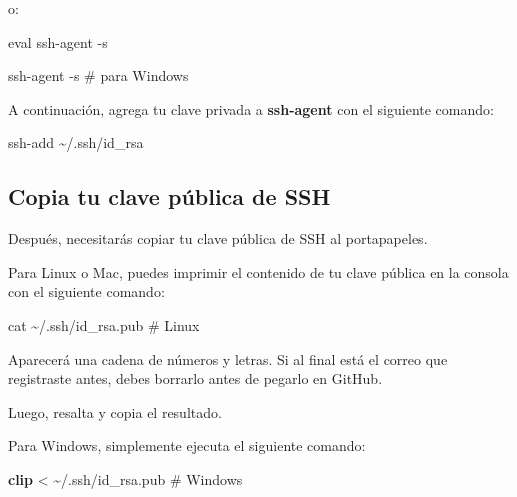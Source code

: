 \documentclass[
  a4paper,
]{article}
\newenvironment{Shaded}{}{}
\newcommand{\AttributeTok}[1]{\textcolor[rgb]{0.84,0.23,0.29}{#1}}
\newcommand{\BuiltInTok}[1]{\textcolor[rgb]{0.84,0.23,0.29}{#1}}
\newcommand{\CommentTok}[1]{\textcolor[rgb]{0.42,0.45,0.49}{#1}}
\newcommand{\ExtensionTok}[1]{\textcolor[rgb]{0.84,0.23,0.29}{\textbf{#1}}}
\newcommand{\FunctionTok}[1]{\textcolor[rgb]{0.44,0.26,0.76}{#1}}
\newcommand{\NormalTok}[1]{\textcolor[rgb]{0.14,0.16,0.18}{#1}}
\newcommand{\OperatorTok}[1]{\textcolor[rgb]{0.14,0.16,0.18}{#1}}
\begin{document}
o:

\begin{Shaded}
\begin{Highlighting}[]
\BuiltInTok{eval}\NormalTok{ ssh{-}agent }\AttributeTok{{-}s}
\end{Highlighting}
\end{Shaded}

\begin{Shaded}
\begin{Highlighting}[]
\FunctionTok{ssh{-}agent} \AttributeTok{{-}s} \CommentTok{\# para Windows}
\end{Highlighting}
\end{Shaded}

A continuación, agrega tu clave privada a \textbf{ssh-agent} con el
siguiente comando:

\begin{Shaded}
\begin{Highlighting}[]
\FunctionTok{ssh{-}add}\NormalTok{ \textasciitilde{}/.ssh/id\_rsa}
\end{Highlighting}
\end{Shaded}

\subsection{Copia tu clave pública de
SSH}\label{copia-tu-clave-puxfablica-de-ssh}

Después, necesitarás copiar tu clave pública de SSH al portapapeles.

Para Linux o Mac, puedes imprimir el contenido de tu clave pública en la
consola con el siguiente comando:

\begin{Shaded}
\begin{Highlighting}[]
\FunctionTok{cat}\NormalTok{ \textasciitilde{}/.ssh/id\_rsa.pub }\CommentTok{\# Linux}
\end{Highlighting}
\end{Shaded}

Aparecerá una cadena de números y letras. Si al final está el correo que
registraste antes, debes borrarlo antes de pegarlo en GitHub.

Luego, resalta y copia el resultado.

Para Windows, simplemente ejecuta el siguiente comando:

\begin{Shaded}
\begin{Highlighting}[]
\ExtensionTok{clip} \OperatorTok{\textless{}}\NormalTok{ \textasciitilde{}/.ssh/id\_rsa.pub }\CommentTok{\# Windows}
\end{Highlighting}
\end{Shaded}
\end{document}

